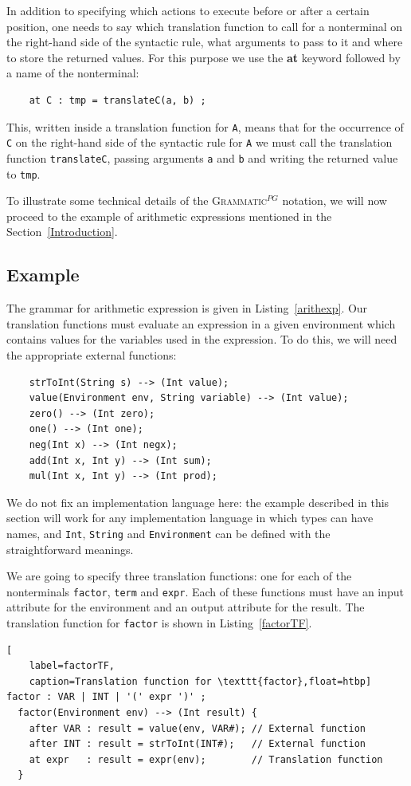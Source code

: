 \documentclass{llncs2e/llncs}
\newcommand{\lstref}[1]{Listing~\ref{#1}}
\newcommand{\secref}[1]{Section~\ref{#1}}
\newcommand{\ATF}{\textsc{Grammatic}$^{PG}$}
\begin{document}
In addition to specifying which actions to execute before or after a certain position, one needs to say which translation function to call for a nonterminal on the right-hand side of the syntactic rule, what arguments to pass to it and where to store the returned values. For this purpose we use the \textbf{at} keyword followed by a name of the nonterminal:
\begin{lstlisting}
	at C : tmp = translateC(a, b) ;
\end{lstlisting}
This, written inside a translation function for \texttt{A}, means that for the occurrence of \texttt{C} on the right-hand side of the syntactic rule for \texttt{A} we must call the translation function \texttt{translateC}, passing arguments \texttt{a} and \texttt{b} and writing the returned value to \texttt{tmp}.

To illustrate some technical details of the \ATF{} notation, we will now proceed to the example of arithmetic expressions mentioned in the \secref{Introduction}.

\subsection{Example}

The grammar for arithmetic expression is given in \lstref{arithexp}. Our translation functions must evaluate an expression in a given environment which contains values for the variables used in the expression. To do this, we will need the appropriate external functions:
\begin{lstlisting}
	strToInt(String s) --> (Int value);
	value(Environment env, String variable) --> (Int value);
	zero() --> (Int zero);
	one() --> (Int one);
	neg(Int x) --> (Int negx);
	add(Int x, Int y) --> (Int sum);
	mul(Int x, Int y) --> (Int prod);
\end{lstlisting}
We do not fix an implementation language here: the example described in this section will work for any implementation language in which types can have names, and \texttt{Int}, \texttt{String} and \texttt{Environment} can be defined with the straightforward meanings.

We are going to specify three translation functions: one for each of the nonterminals \texttt{factor}, \texttt{term} and \texttt{expr}. Each of these functions must have an input attribute for the environment and an output attribute for the result. The translation function for \texttt{factor} is shown in \lstref{factorTF}.
\begin{lstlisting}[
	label=factorTF,
	caption=Translation function for \texttt{factor},float=htbp]
factor : VAR | INT | '(' expr ')' ;           
  factor(Environment env) --> (Int result) { 
    after VAR : result = value(env, VAR#); // External function 
    after INT : result = strToInt(INT#);   // External function
    at expr   : result = expr(env);        // Translation function
  }
\end{lstlisting}
\end{document}

